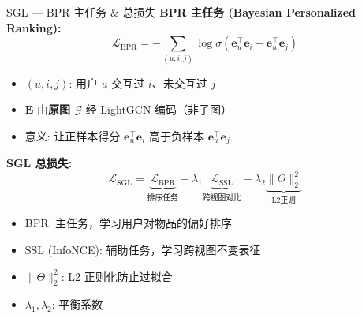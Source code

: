 \documentclass[9pt, aspectratio=169]{ctexbeamer}
\begin{document}
\begin{frame}{SGL --- BPR 主任务 \& 总损失}
  \textbf{BPR 主任务 (Bayesian Personalized Ranking):}
  \begin{equation*}
    \mathcal{L}_{\text{BPR}} = -\sum_{(u,i,j)} \log\sigma(\mathbf{e}_u^\top\mathbf{e}_i - \mathbf{e}_u^\top\mathbf{e}_j)
  \end{equation*}
  \begin{itemize}\footnotesize
    \item $(u,i,j)$: 用户 $u$ 交互过 $i$、未交互过 $j$
    \item $\mathbf{E}$ 由\textbf{原图 $\mathcal{G}$} 经 LightGCN 编码（非子图）
    \item 意义: 让正样本得分 $\mathbf{e}_u^\top\mathbf{e}_i$ 高于负样本 $\mathbf{e}_u^\top\mathbf{e}_j$
  \end{itemize}

  \vspace{0.3em}
  \textbf{SGL 总损失:}
  \begin{equation*}
    \mathcal{L}_{\text{SGL}} = \underbrace{\mathcal{L}_{\text{BPR}}}_{\text{排序任务}}
    + \lambda_1 \underbrace{\mathcal{L}_{\text{SSL}}}_{\text{跨视图对比}}
    + \lambda_2 \underbrace{\|\Theta\|_2^2}_{\text{L2正则}}
  \end{equation*}
  \begin{itemize}\footnotesize
    \item BPR: 主任务，学习用户对物品的偏好排序
    \item SSL (InfoNCE): 辅助任务，学习跨视图不变表征
    \item $\|\Theta\|_2^2$: L2 正则化防止过拟合
    \item $\lambda_1,\lambda_2$: 平衡系数
  \end{itemize}
\end{frame}

\end{document}
